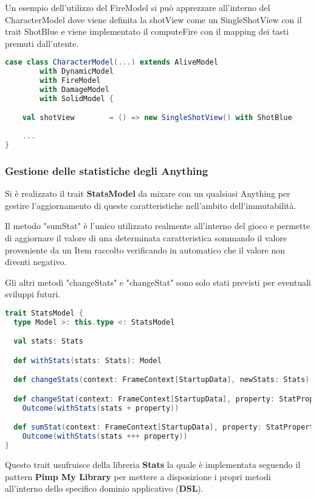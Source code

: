 Un esempio dell'utilizzo del FireModel si può apprezzare all'interno del CharacterModel 
dove viene definita la shotView come un SingleShotView con il trait ShotBlue
e viene implementato il computeFire con il mapping dei tasti premuti dall'utente.

\begin{lstlisting}[language=Scala]
case class CharacterModel(...) extends AliveModel
		with DynamicModel
		with FireModel
		with DamageModel
		with SolidModel {

	val shotView        = () => new SingleShotView() with ShotBlue
	
	...
}
\end{lstlisting}

\subsubsection{Gestione delle statistiche degli Anything}
Si è realizzato il trait \textbf{StatsModel} da mixare con un qualsiasi Anything 
per gestire l'aggiornamento di queste caratteristiche nell'ambito dell'immutabilità.

Il metodo "sumStat" è l'unico utilizzato realmente all'interno del gioco e permette di 
aggiornare il valore di una determinata caratteristica sommando il valore proveniente da un Item raccolto 
verificando in automatico che il valore non diventi negativo.

Gli altri metodi "changeStats" e "changeStat" sono solo stati previsti per eventuali sviluppi futuri.  

\begin{lstlisting}[language=Scala]
trait StatsModel {
  type Model >: this.type <: StatsModel

  val stats: Stats

  def withStats(stats: Stats): Model

  def changeStats(context: FrameContext[StartupData], newStats: Stats): Outcome[Model] = Outcome(withStats(newStats))

  def changeStat(context: FrameContext[StartupData], property: StatProperty): Outcome[Model] =
    Outcome(withStats(stats + property))

  def sumStat(context: FrameContext[StartupData], property: StatProperty): Outcome[Model] =
    Outcome(withStats(stats +++ property))
}
\end{lstlisting}

Questo trait usufruisce della libreria \textbf{Stats} la quale è implementata seguendo il pattern \textbf{Pimp My Library} 
per mettere a disposizione i propri metodi all'interno dello specifico dominio applicativo (\textbf{DSL}).

